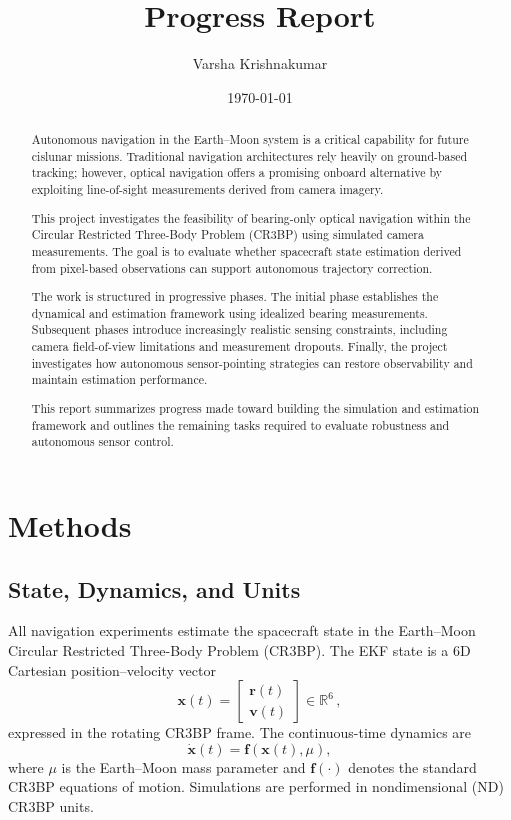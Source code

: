 \documentclass[twocolumn]{article}
\title{Progress Report}
\author{Varsha Krishnakumar}
\date{\today}
\begin{document}
\maketitle

\begin{abstract}

Autonomous navigation in the Earth--Moon system is a critical capability for future cislunar missions. Traditional navigation architectures rely heavily on ground-based tracking; however, optical navigation offers a promising onboard alternative by exploiting line-of-sight measurements derived from camera imagery.

This project investigates the feasibility of bearing-only optical navigation within the Circular Restricted Three-Body Problem (CR3BP) using simulated camera measurements. The goal is to evaluate whether spacecraft state estimation derived from pixel-based observations can support autonomous trajectory correction.

The work is structured in progressive phases. The initial phase establishes the dynamical and estimation framework using idealized bearing measurements. Subsequent phases introduce increasingly realistic sensing constraints, including camera field-of-view limitations and measurement dropouts. Finally, the project investigates how autonomous sensor-pointing strategies can restore observability and maintain estimation performance.

This report summarizes progress made toward building the simulation and estimation framework and outlines the remaining tasks required to evaluate robustness and autonomous sensor control.
\end{abstract}

\section{Methods}

\subsection{State, Dynamics, and Units}
All navigation experiments estimate the spacecraft state in the Earth--Moon Circular Restricted Three-Body Problem (CR3BP). The EKF state is a 6D Cartesian position--velocity vector
\begin{equation}
\mathbf{x}(t) =
\begin{bmatrix}
\mathbf{r}(t) \\
\mathbf{v}(t)
\end{bmatrix}
\in \mathbb{R}^6 \,,
\end{equation}
expressed in the rotating CR3BP frame. The continuous-time dynamics are
\begin{equation}
\dot{\mathbf{x}}(t) = \mathbf{f}\!\left(\mathbf{x}(t), \mu\right),
\end{equation}
where $\mu$ is the Earth--Moon mass parameter and $\mathbf{f}(\cdot)$ denotes the standard CR3BP equations of motion. Simulations are performed in nondimensional (ND) CR3BP units.
\end{document}

